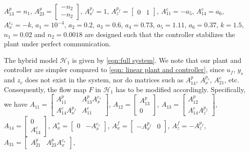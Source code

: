 $A_{13}^p = n_1$,
$A_{23}^p = \left[ \begin{smallmatrix}
    -n_2 \\ -n_2
\end{smallmatrix} \right]$,
$A_{x}^{p_f} = 1$,
$A_{z}^{p_f} = \left[ \begin{smallmatrix}
    0 & 1
\end{smallmatrix} \right]$,
$A_{11}^c = -a_5$,
$A_{14}^c = a_6$,
$A_{x}^{c_s}= -k$,
%
$a_1 =10^{-4}$, $a_2 = 0.2$, $a_3 = 0.6$, $a_4 = 0.73$, $a_5 = 1.11$, $a_6 = 0.37$, $k = 1.5$, $n_1 = 0.02$ and $n_2 = 0.0018$ are designed such that the controller stabilizes the plant under perfect communication. 

The hybrid model $\mathcal{H}_1$ is given by \eqref{eqn:full system}. We note that our plant and controller are simpler compared to \eqref{eqn: linear plant and controller}, since $u_f$, $y_s$ and $z_c$ does not exist in the system, nor do matrices such as $A_{14}^p$, $A_x^{p_s}$, $A_{21}^c$, etc. Consequently, the flow map $F$ in $\mathcal{H}_1$ has to be modified accordingly. Specifically, we have 
$A_{11} = \left[\begin{smallmatrix}A_{11}^p & A_{13}^p A_x^{c_s}\\ A_{14}^c A_x^{p_f} & A_{11}^c \end{smallmatrix} \right]$, 
%
$A_{12} = \left[\begin{smallmatrix}  A_{13}^p \\ 0\end{smallmatrix}\right]$,
%
$A_{13} = \left[\begin{smallmatrix} A_{12}^p  \\ A_{14}^c A_z^{p_f} \end{smallmatrix} \right]$,
%
$A_{14} = \left[ \begin{smallmatrix}0 \\ A_{14}^c\end{smallmatrix} \right]$,
%
$A_x^s = \left[\begin{smallmatrix}
     0 & -A_x^{c_s}
\end{smallmatrix} \right]$,
$A_x^f = \left[\begin{smallmatrix}
    -A_x^{p_f} & 0
\end{smallmatrix} \right]$, 
$A_z^f = -A_z^{p_f}$, 
%
$A_{31} = \left[\begin{smallmatrix}
    A_{21}^p & A_{23}^p A_x^{c_s}
\end{smallmatrix}\right]$,
